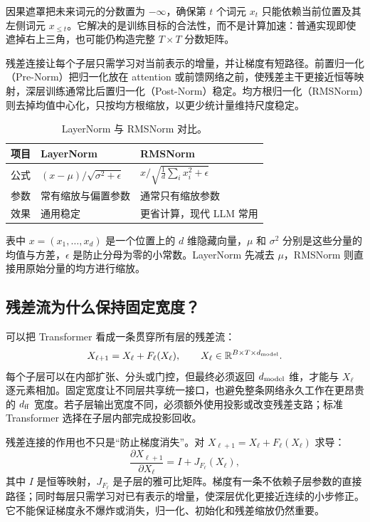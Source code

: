 因果遮罩把未来词元的分数置为 $-\infty$，确保第 $t$ 个词元 $x_t$ 只能依赖当前位置及其左侧词元 $x_{\le t}$。它解决的是训练目标的合法性，而不是计算加速：普通实现即使遮掉右上三角，也可能仍构造完整 $T\times T$ 分数矩阵。

残差连接让每个子层只需学习对当前表示的增量，并让梯度有短路径。前置归一化（Pre-Norm）把归一化放在 attention 或前馈网络之前，使残差主干更接近恒等映射，深层训练通常比后置归一化（Post-Norm）稳定。均方根归一化（RMSNorm）则去掉均值中心化，只按均方根缩放，以更少统计量维持尺度稳定。

\begin{table}[htbp]
\centering
\small
\begin{tabularx}{0.86\textwidth}{lYY}
\toprule
项目 & LayerNorm & RMSNorm\\
\midrule
公式 & $(x-\mu)/\sqrt{\sigma^2+\epsilon}$ & $x/\sqrt{\frac{1}{d}\sum_i x_i^2+\epsilon}$\\
参数 & 常有缩放与偏置参数 & 通常只有缩放参数\\
效果 & 通用稳定 & 更省计算，现代 LLM 常用\\
\bottomrule
\end{tabularx}
\caption{LayerNorm 与 RMSNorm 对比。}
\end{table}

表中 $x=(x_1,\ldots,x_d)$ 是一个位置上的 $d$ 维隐藏向量，$\mu$ 和 $\sigma^2$ 分别是这些分量的均值与方差，$\epsilon$ 是防止分母为零的小常数。LayerNorm 先减去 $\mu$，RMSNorm 则直接用原始分量的均方进行缩放。

\subsection{残差流为什么保持固定宽度？}

可以把 Transformer 看成一条贯穿所有层的残差流：
\[
X_{\ell+1}=X_\ell+F_\ell(X_\ell),\qquad
X_\ell\in\mathbb R^{B\times T\times d_{\rm model}}.
\]
每个子层可以在内部扩张、分头或门控，但最终必须返回 $d_{\rm model}$ 维，才能与 $X_\ell$ 逐元素相加。固定宽度让不同层共享统一接口，也避免整条网络永久工作在更昂贵的 $d_{\rm ff}$ 宽度。若子层输出宽度不同，必须额外使用投影或改变残差支路；标准 Transformer 选择在子层内部完成投影回收。

残差连接的作用也不只是“防止梯度消失”。对 $X_{\ell+1}=X_\ell+F_\ell(X_\ell)$ 求导：
\[
\frac{\partial X_{\ell+1}}{\partial X_\ell}
=I+J_{F_\ell}(X_\ell),
\]
其中 $I$ 是恒等映射，$J_{F_\ell}$ 是子层的雅可比矩阵。梯度有一条不依赖子层参数的直接路径；同时每层只需学习对已有表示的增量，使深层优化更接近连续的小步修正。它不能保证梯度永不爆炸或消失，归一化、初始化和残差缩放仍然重要。

